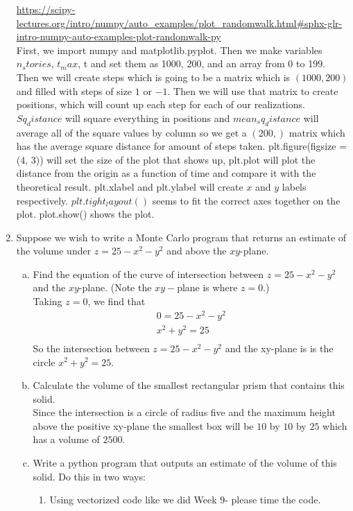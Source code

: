 \documentclass[10pt,letterpaper]{article}
\begin{document}
\begin{enumerate}
{\tiny \url{https://scipy-lectures.org/intro/numpy/auto_examples/plot_randomwalk.html#sphx-glr-intro-numpy-auto-examples-plot-randomwalk-py}}
\\
First, we import numpy and matplotlib.pyplot. Then we make variables $n_stories$, $t_max$, 
t and set them as 1000, 200, and an array from 0 to 199. Then we will create steps 
which is going to be a matrix which is $(1000, 200)$ and filled with steps of size 
$1$ or $-1$. Then we will use that matrix to create positions, which will count up 
each step for each of our realizations. $Sq_distance$ will square everything 
in positions and $mean_sq_distance$ will average all of the square values by column
so we get a $(200,)$ matrix which has the average square distance for amount of 
steps taken. plt.figure(figsize = (4, 3)) will set the size of the plot that shows
up, plt.plot will plot the distance from the origin as a function of time and compare 
it with the theoretical result. plt.xlabel and plt.ylabel will create $x$ and $y$ 
labels respectively. $plt.tight_layout()$ seems to fit the correct axes together on 
the plot. plot.show() shows the plot. 

 \item  Suppose we wish to write a Monte Carlo program that returns an estimate of the volume under $z=25-x^2-y^2$ and above the $xy$-plane.
 \begin{enumerate}[a)]
\item  Find the equation of the curve of intersection between $z=25-x^2-y^2$ and the $xy$-plane. (Note the $xy-$plane is where $z=0$.)
\\
Taking $z = 0$, we find that 
\begin{gather*}
  0 = 25 - x^2 - y^2 \\
  x^2 + y^2 = 25\\
\end{gather*}
So the intersection between $z = 25-x^2-y^2$ and the xy-plane is is the circle 
$x^2 + y^2 = 25$. 
\item Calculate the volume of the smallest rectangular prism that contains this solid.
\\
Since the intersection is a circle of radius five and the maximum height above the 
positive xy-plane the smallest box will be $10$ by $10$ by $25$ which has a volume of $2500$. 

\item  Write a python program that outputs an estimate of the volume of this solid.  Do this in two ways:
\begin{enumerate}
\item  Using vectorized code like we did Week 9- please time the code.


\end{enumerate}
\end{enumerate}
\end{enumerate}
\end{document}
